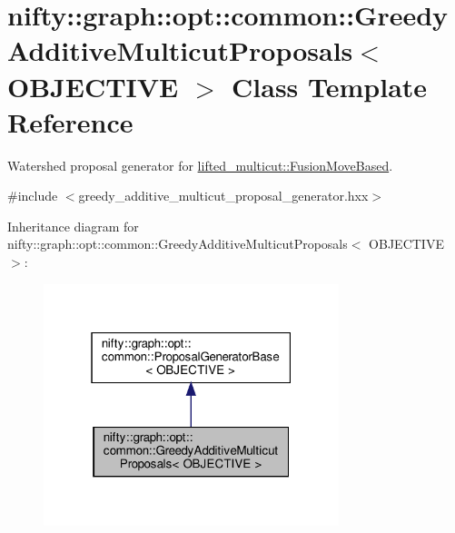 \hypertarget{classnifty_1_1graph_1_1opt_1_1common_1_1GreedyAdditiveMulticutProposals}{}\section{nifty\+:\+:graph\+:\+:opt\+:\+:common\+:\+:Greedy\+Additive\+Multicut\+Proposals$<$ O\+B\+J\+E\+C\+T\+I\+VE $>$ Class Template Reference}
\label{classnifty_1_1graph_1_1opt_1_1common_1_1GreedyAdditiveMulticutProposals}


Watershed proposal generator for \hyperlink{classnifty_1_1graph_1_1opt_1_1lifted__multicut_1_1FusionMoveBased}{lifted\+\_\+multicut\+::\+Fusion\+Move\+Based}.  




{\ttfamily \#include $<$greedy\+\_\+additive\+\_\+multicut\+\_\+proposal\+\_\+generator.\+hxx$>$}



Inheritance diagram for nifty\+:\+:graph\+:\+:opt\+:\+:common\+:\+:Greedy\+Additive\+Multicut\+Proposals$<$ O\+B\+J\+E\+C\+T\+I\+VE $>$\+:
\nopagebreak
\begin{figure}[H]
\begin{center}
\leavevmode
\includegraphics[width=244pt]{classnifty_1_1graph_1_1opt_1_1common_1_1GreedyAdditiveMulticutProposals__inherit__graph}
\end{center}
\end{figure}


